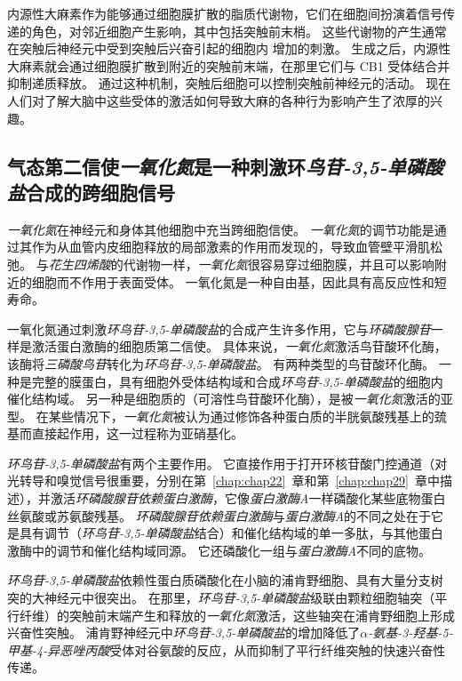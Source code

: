 内源性大麻素作为能够通过细胞膜扩散的脂质代谢物，它们在细胞间扮演着信号传递的角色，对邻近细胞产生影响，其中包括突触前末梢。
这些代谢物的产生通常在突触后神经元中受到突触后兴奋引起的细胞内  增加的刺激。
生成之后，内源性大麻素就会通过细胞膜扩散到附近的突触前末端，在那里它们与 CB1 受体结合并抑制递质释放。
通过这种机制，突触后细胞可以控制突触前神经元的活动。 
现在人们对了解大脑中这些受体的激活如何导致大麻的各种行为影响产生了浓厚的兴趣。



\subsection{气态第二信使\textit{一氧化氮}是一种刺激环\textit{鸟苷-3,5-单磷酸盐}合成的跨细胞信号}

\textit{一氧化氮}在神经元和身体其他细胞中充当跨细胞信使。
\textit{一氧化氮}的调节功能是通过其作为从血管内皮细胞释放的局部激素的作用而发现的，导致血管壁平滑肌松弛。
与\textit{花生四烯酸}的代谢物一样，\textit{一氧化氮}很容易穿过细胞膜，并且可以影响附近的细胞而不作用于表面受体。
一氧化氮是一种自由基，因此具有高反应性和短寿命。


一氧化氮通过刺激\textit{环鸟苷-3,5-单磷酸盐}的合成产生许多作用，它与\textit{环磷酸腺苷}一样是激活蛋白激酶的细胞质第二信使。
具体来说，\textit{一氧化氮}激活鸟苷酸环化酶，该酶将\textit{三磷酸鸟苷}转化为\textit{环鸟苷-3,5-单磷酸盐}。
有两种类型的鸟苷酸环化酶。 
一种是完整的膜蛋白，具有细胞外受体结构域和合成\textit{环鸟苷-3,5-单磷酸盐}的细胞内催化结构域。
另一种是细胞质的（可溶性鸟苷酸环化酶），是被\textit{一氧化氮}激活的亚型。
在某些情况下，\textit{一氧化氮}被认为通过修饰各种蛋白质的半胱氨酸残基上的巯基而直接起作用，这一过程称为亚硝基化。


\textit{环鸟苷-3,5-单磷酸盐}有两个主要作用。
它直接作用于打开环核苷酸门控通道（对光转导和嗅觉信号很重要，分别在第~\ref{chap:chap22}~章和第~\ref{chap:chap29}~章中描述），并激活\textit{环磷酸腺苷依赖蛋白激酶}，它像\textit{蛋白激酶A}一样磷酸化某些底物蛋白 丝氨酸或苏氨酸残基。
\textit{环磷酸腺苷依赖蛋白激酶}与\textit{蛋白激酶A}的不同之处在于它是具有调节（\textit{环鸟苷-3,5-单磷酸盐}结合）和催化结构域的单一多肽，与其他蛋白激酶中的调节和催化结构域同源。
它还磷酸化一组与\textit{蛋白激酶A}不同的底物。


\textit{环鸟苷-3,5-单磷酸盐}依赖性蛋白质磷酸化在小脑的浦肯野细胞、具有大量分支树突的大神经元中很突出。
在那里，\textit{环鸟苷-3,5-单磷酸盐}级联由颗粒细胞轴突（平行纤维）的突触前末端产生和释放的\textit{一氧化氮}激活，这些轴突在浦肯野细胞上形成兴奋性突触。
浦肯野神经元中\textit{环鸟苷-3,5-单磷酸盐}的增加降低了\textit{$\alpha$-氨基-3-羟基-5-甲基-4-异恶唑丙酸}受体对谷氨酸的反应，从而抑制了平行纤维突触的快速兴奋性传递。



